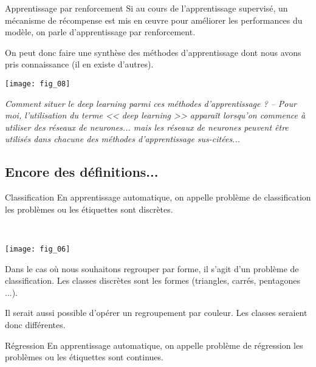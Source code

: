 \begin{defi}{Apprentissage par renforcement}
Si au cours de l'apprentissage supervisé, un mécanisme de récompense est mis en \oe{}uvre pour améliorer les performances du modèle, on parle d'apprentissage par renforcement.
\end{defi}



On peut donc faire une synthèse des méthodes d'apprentissage dont nous avons pris connaissance (il en existe d'autres).

\begin{center}
\texttt{[image: fig\_08]}
\end{center}

\textit{Comment situer le deep learning parmi ces méthodes d'apprentissage ? --  Pour moi,  l'utilisation du terme << deep learning >> apparaît lorsqu'on commence à utiliser des réseaux de neurones... mais les réseaux de neurones peuvent être utilisés dans chacune des méthodes d'apprentissage sus-citées...}

\subsection{Encore des définitions...}

\begin{defi}{Classification}
En apprentissage automatique, on appelle problème de classification les problèmes ou les étiquettes sont discrètes.
\end{defi}

\begin{exemple} ~\\

\begin{center}
\texttt{[image: fig\_06]}
\end{center}

Dans le cas où nous souhaitons regrouper par forme, il s'agit d'un problème de classification. Les classes discrètes sont les formes (triangles, carrés, pentagones ...). 

Il serait aussi possible d'opérer un regroupement par couleur. Les classes seraient donc différentes.
\end{exemple}

\begin{defi}{Régression}
En apprentissage automatique, on appelle problème de régression les problèmes ou les étiquettes sont continues.
\end{defi}

